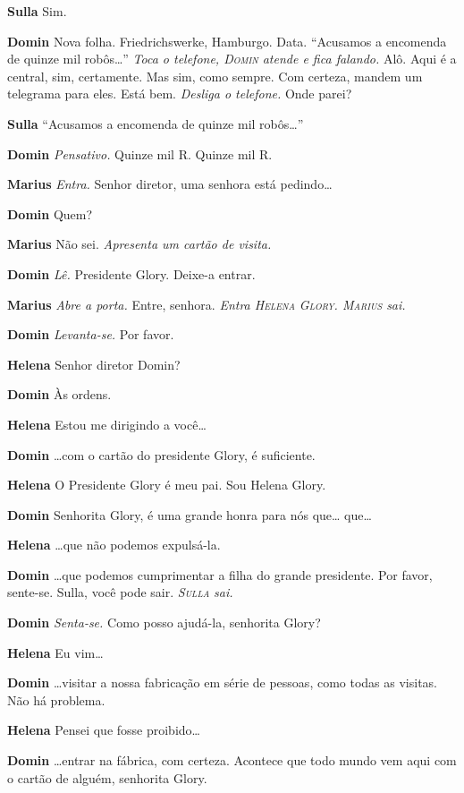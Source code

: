 \textbf{Sulla} Sim.

\textbf{Domin} Nova folha. Friedrichswerke, Hamburgo. Data. ``Acusamos a encomenda de
quinze mil robôs\ldots{}'' \emph{Toca o telefone, \textsc{Domin} atende e fica falando.}
Alô. Aqui é a central, sim, certamente. Mas sim, como sempre. Com
certeza, mandem um telegrama para eles. Está bem. \emph{Desliga o telefone.}
Onde parei?

\textbf{Sulla} ``Acusamos a encomenda de quinze mil robôs\ldots{}''

\textbf{Domin} \emph{Pensativo.} Quinze mil R. Quinze mil R.

\textbf{Marius} \emph{Entra.} Senhor diretor, uma senhora está pedindo\ldots{}

\textbf{Domin} Quem?

\textbf{Marius} Não sei. \emph{Apresenta um cartão de visita.}

\textbf{Domin} \emph{Lê.} Presidente Glory. Deixe-a entrar.

\textbf{Marius} \emph{Abre a porta.} Entre, senhora.
\emph{Entra \textsc{Helena Glory}. \textsc{Marius} sai.}

\textbf{Domin} \emph{Levanta-se.} Por favor.

\textbf{Helena} Senhor diretor Domin?

\textbf{Domin} Às ordens.

\textbf{Helena} Estou me dirigindo a você\ldots{}

\textbf{Domin} \ldots{}com o cartão do presidente Glory, é suficiente.

\textbf{Helena} O Presidente Glory é meu pai. Sou Helena Glory.

\textbf{Domin} Senhorita Glory, é uma grande honra para nós que\ldots{} que\ldots{}

\textbf{Helena} \ldots{}que não podemos expulsá-la.

\textbf{Domin} \ldots{}que podemos cumprimentar a filha do grande presidente. Por favor,
sente-se. Sulla, você pode sair.
\emph{\textsc{Sulla} sai.}

\textbf{Domin} \emph{Senta-se.} Como posso ajudá-la, senhorita Glory?

\textbf{Helena} Eu vim\ldots{}

\textbf{Domin} \ldots{}visitar a nossa fabricação em série de pessoas, como todas as visitas.
Não há problema.

\textbf{Helena} Pensei que fosse proibido\ldots{}

\textbf{Domin} \ldots{}entrar na fábrica, com certeza. Acontece que todo mundo vem aqui com o
cartão de alguém, senhorita Glory.

